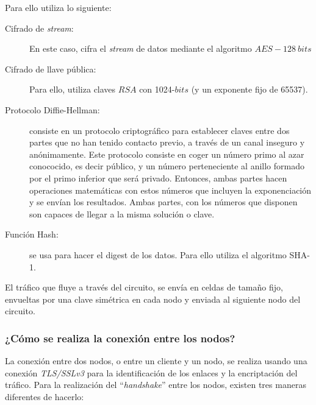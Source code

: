 \documentclass[10pt,a4paper,spanish]{article}
\begin{document}
Para ello utiliza lo siguiente:

\begin{description}
    \item [Cifrado de \textit{stream}:] En este caso, cifra el \textit{stream} de datos mediante el algoritmo $AES-128~bits$
    \item [Cifrado de llave pública:] Para ello, utiliza claves $RSA$ con 1024-$bits$ (y un exponente fijo de 65537).
    \item [Protocolo Diffie-Hellman:] consiste en un protocolo criptográfico para establecer claves entre dos partes que no han tenido contacto previo, a través de un canal inseguro y anónimamente. Este protocolo consiste en coger un número primo al azar conococido, es decir público, y un número perteneciente al anillo formado por el primo inferior que será privado. Entonces, ambas partes hacen operaciones matemáticas con estos números que incluyen la exponenciación y se envían los resultados. Ambas partes, con los números que disponen son capaces de llegar a la misma solución o clave.
    \item [Función Hash:] se usa para hacer el digest de los datos. Para ello utiliza el algoritmo SHA-1.
\end{description}

El tráfico que fluye a través del circuito, se envía en celdas de tamaño fijo, envueltas por una clave simétrica en cada nodo y enviada al siguiente nodo del circuito. 

\subsubsection{¿Cómo se realiza la conexión entre los nodos?}

La conexión entre dos nodos, o entre un cliente y un nodo, se realiza usando una conexión \textit{TLS/SSLv3} para la identificación de los enlaces y la encriptación del tráfico. Para la realización del ``\textit{handshake}'' entre los nodos, existen tres maneras diferentes de hacerlo:
\end{document}
